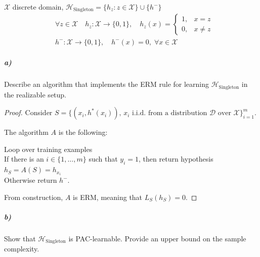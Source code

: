 \documentclass{article}
\newcommand{\<}{\langle}
\renewcommand{\>}{\rangle}
\theoremstyle{definition}
\def\gD{{\mathcal{D}}}
\def\gH{{\mathcal{H}}}
\def\gX{{\mathcal{X}}}
\newcommand{\sft}[2]{\{#1, \dots, #2\}}
\newcommand{\szo}{\{0, 1\}}
\newcommand{\som}{\sft{1}{m}}
\newcommand{\hs}{h_S}
\newcommand{\sft}[2]{\{#1, \dots, #2\}}
\newcommand{\szo}{\{0, 1\}}
\newcommand{\som}{\sft{1}{m}}
\newcommand{\hs}{h_S}
\begin{document}
$\gX$ discrete domain, $\gH_\text{Singleton} = \{h_z \colon z \in \gX\} \cup \{h^-\}$
\begin{align*}
  &\forall z \in \gX \quad
    h_z \colon \gX \rightarrow \szo, \quad
    h_z(x) = \begin{cases}
      1, & x = z \\
      0, & x \neq z
    \end{cases} \\
  &h^- \colon \gX \rightarrow \szo, \quad h^-(x) = 0, \; \forall x \in \gX
\end{align*}
\subparagraph{a)} Describe an algorithm that implements the ERM rule for learning
$\gH_\text{Singleton}$ in the realizable setup.
\begin{proof}

\noindent Consider
$S = \{(x_i, h^*(x_i)),\, x_i \text{ i.i.d.\ from a distribution $\gD$ over } \gX\}_{i=1}^m$.

\noindent The algorithm $A$ is the following:

\indent Loop over training examples \\
\indent   If there is an $i \in \som$ such that $y_i = 1$, then
            return hypothesis $\hs = A(S) = h_{x_i}$ \\
\indent   Otherwise return $h^-$.

From construction, $A$ is ERM, meaning that $L_S(\hs) = 0$.
\end{proof}
\subparagraph{b)} Show that $\gH_\text{Singleton}$ is PAC-learnable. Provide an upper bound on the sample complexity.
\end{document}
